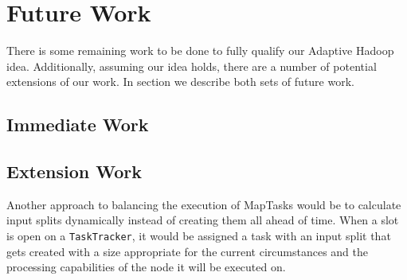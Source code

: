 \section{Future Work}
\label{section:futurework}

There is some remaining work to be done to fully qualify our Adaptive Hadoop idea. Additionally, 
assuming our idea holds, there are a number of potential extensions of our work. In section we
describe both sets of future work.

\subsection{Immediate Work}

\subsection{Extension Work}
Another approach to balancing the execution of MapTasks would be to calculate input splits
dynamically instead of creating them all ahead of time. When a slot is open on a \texttt{TaskTracker}, it would
be assigned a task with an input split that gets created with a size appropriate for the current circumstances
and the processing capabilities of the node it will be executed on.
